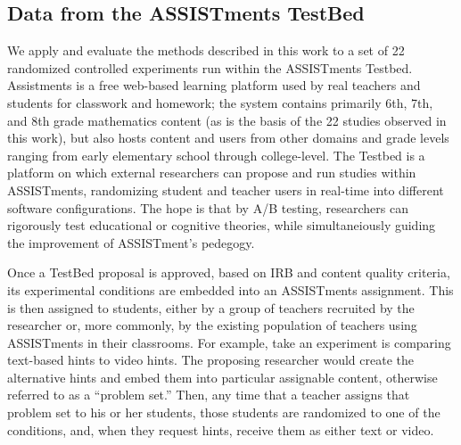 \subsection{Data from the ASSISTments TestBed}
We apply and evaluate the methods described in this work to a set of
22 randomized controlled experiments run within the ASSISTments
Testbed. Assistments is a free web-based learning platform used by
real teachers and students for classwork and homework; the system
contains primarily 6th, 7th, and 8th grade mathematics content (as is
the basis of the 22 studies observed in this work), but also hosts
content and users from other domains and grade levels ranging from
early elementary school through college-level.
The Testbed is a platform on which
external researchers can propose and run studies within
ASSISTments, randomizing student and teacher users in real-time into
different software configurations.
The hope is that by A/B testing, researchers can rigorously test
educational or cognitive theories, while simultaneiously guiding the
improvement of ASSISTment's pedegogy.

Once a TestBed proposal is approved, based on IRB and content quality
criteria, its experimental conditions are embedded into an ASSISTments
assignment.
This is then assigned to students, either by a group of
teachers recruited by the researcher or, more commonly,
by the existing population of teachers using ASSISTments in their
classrooms. For example, take an experiment is comparing text-based
hints to video hints.
The proposing researcher would create the alternative hints and embed them
into particular assignable content, otherwise referred to as a ``problem set.''
Then, any
time that a teacher assigns that problem set to his or her students,
those students are randomized to one of the conditions, and, when they
request hints, receive them as either text or video.

